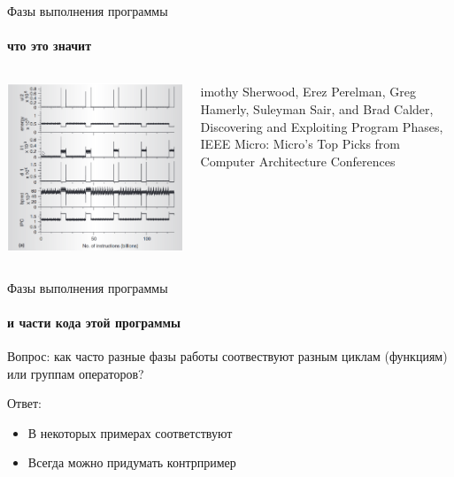 \documentclass{beamer}              %
\begin{document}
\begin{frame}{Фазы выполнения программы}
  \framesubtitle{что это значит}
   
  \begin{columns}
        \includegraphics[height=.9\textheight]{img/Phases.png}

      imothy Sherwood, Erez Perelman, Greg Hamerly, Suleyman Sair, and Brad Calder, Discovering and Exploiting Program Phases, IEEE Micro: Micro's Top Picks from Computer Architecture Conferences
      
  \end{columns}		  
\end{frame}

\begin{frame}{Фазы выполнения программы}
  \framesubtitle{и части кода этой программы}
  Вопрос: как часто разные фазы работы соотвествуют разным циклам (функциям) или группам операторов?
  
  Ответ: 
  \begin{itemize}
      \item В некоторых примерах соответствуют
      \item Всегда можно придумать контрпример
  \end{itemize}
  
\end{frame}
\end{document}
